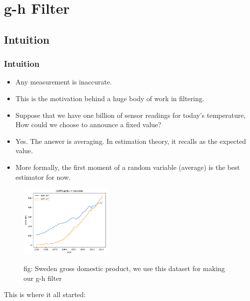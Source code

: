 \section{g-h Filter}

\subsection{Intuition}
\begin{frame}
   \frametitle{Intuition}

		\begin{itemize}
			\item Any measurement is inaccurate.
			\item This is the motivation behind a huge body of work in filtering.
			\item Suppose that we have one billion of sensor readings for today's temperature, How could we choose to announce a fixed value?
			\item Yes. The answer is averaging. In estimation theory, it recalls as the expected value. 
			\item More formally, the first moment of a random variable (average) is the best estimator for now. 
		\end{itemize}
		
		\begin{figure}
		\centering
			\includegraphics[width=0.40\textwidth]{Figures/g-h_filter/GDP.png}
		\label{gdp}
		\caption{fig: Sweden gross domestic product, we use this dataset for making our g-h filter}
	\end{figure}
	This is where it all started: \cite{labbe2014kalman}	
\end{frame}

